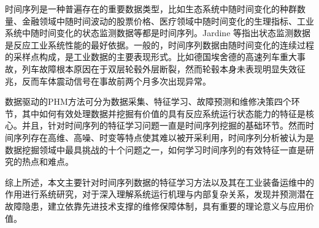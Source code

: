时间序列是一种普遍存在的重要数据类型，比如生态系统中随时间变化的种群数量、金融领域中随时间波动的股票价格、医疗领域中随时间变化的生理指标、工业系统中随时间变化的状态监测数据等都是时间序列。Jardine 等指出状态监测数据是反应工业系统性能的最好依据\cite{jardine2006review}。一般的，时间序列数据由随时间变化的连续过程的采样点构成\cite{langkvist2014review}，是工业数据的主要表现形式\cite{esling2012time,gaber2005mining}。比如德国埃舍德的高速列车重大事故，列车故障根本原因在于双层轮毂外层断裂，然而轮毂本身未表现明显失效征兆，反而车体震动信号在事故前两个月多次出现异常\cite{oestern2000facts}。


数据驱动的PHM方法可分为数据采集、特征学习、故障预测和维修决策四个环节，其中如何有效处理数据并挖掘有价值的具有反应系统运行状态能力的特征是核心\cite{zhou2011latent, he2012integrated, patil2008failure, yan2004prognostic}。并且，针对时间序列的特征学习问题一直是时间序列挖掘的基础环节\cite{fu2011review}。然而时间序列存在高维、高噪、时变等特点使其难以被开采利用，时间序列分析被认为是数据挖掘领域中最具挑战的十个问题之一，如何学习时间序列的有效特征一直是研究的热点和难点\cite{langkvist2014review}。

综上所述，本文主要针对时间序列数据的特征学习方法以及其在工业装备运维中的作用进行系统研究，对于深入理解系统运行机理与内部复杂关系，发现并预测潜在故障隐患，建立依靠先进技术支撑的维修保障体制，具有重要的理论意义与应用价值。

